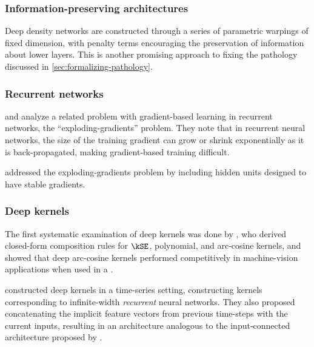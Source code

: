 %
%
%

\subsubsection{Information-preserving architectures}
Deep density networks \citep{rippel2013high} are constructed through a series of parametric warpings of fixed dimension, with penalty terms encouraging the preservation of information about lower layers.
This is another promising approach to fixing the pathology discussed in \cref{sec:formalizing-pathology}.

\subsubsection{Recurrent networks}
\citet{bengio1994learning} and \citet{pascanu2012understanding} analyze a related problem with gradient-based learning in recurrent networks, the ``exploding-gradients'' problem.
They note that in recurrent neural networks, the size of the training gradient can grow or shrink exponentially as it is back-propagated, making gradient-based training difficult.

\citet{hochreiter1997long} addressed the exploding-gradients problem by including hidden units designed to have stable gradients.

\subsubsection{Deep kernels}

The first systematic examination of deep kernels was done by \citet{cho2009kernel}, who derived closed-form composition rules for $\kSE$, polynomial, and arc-cosine kernels, and showed that deep arc-cosine kernels performed competitively in machine-vision applications when used in a \SVM{}.

\citet{hermans2012recurrent} constructed deep kernels in a time-series setting, constructing kernels corresponding to infinite-width \emph{recurrent} neural networks.
They also proposed concatenating the implicit feature vectors from previous time-steps with the current inputs, resulting in an architecture analogous to the input-connected architecture proposed by \citet[chapter 2]{neal1995bayesian}.

